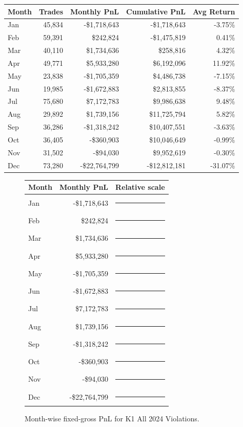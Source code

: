 \documentclass[11pt]{article}
\begin{document}
\begin{center}
\begin{tabular}{@{}lrrrr@{}}
\toprule
Month & Trades & Monthly PnL & Cumulative PnL & Avg Return \\
\midrule
Jan & 45,834 & -\$1,718,643 & -\$1,718,643 & -3.75\% \\
Feb & 59,391 & \$242,824 & -\$1,475,819 & 0.41\% \\
Mar & 40,110 & \$1,734,636 & \$258,816 & 4.32\% \\
Apr & 49,771 & \$5,933,280 & \$6,192,096 & 11.92\% \\
May & 23,838 & -\$1,705,359 & \$4,486,738 & -7.15\% \\
Jun & 19,985 & -\$1,672,883 & \$2,813,855 & -8.37\% \\
Jul & 75,680 & \$7,172,783 & \$9,986,638 & 9.48\% \\
Aug & 29,892 & \$1,739,156 & \$11,725,794 & 5.82\% \\
Sep & 36,286 & -\$1,318,242 & \$10,407,551 & -3.63\% \\
Oct & 36,405 & -\$360,903 & \$10,046,649 & -0.99\% \\
Nov & 31,502 & -\$94,030 & \$9,952,619 & -0.30\% \\
Dec & 73,280 & -\$22,764,799 & -\$12,812,181 & -31.07\% \\
\bottomrule
\end{tabular}
\end{center}

\begin{figure}[h]
\centering
\begin{tabular}{@{}lrl@{}}
\toprule
Month & Monthly PnL & Relative scale \\
\midrule
Jan & -\$1,718,643 & \textcolor{red}{\rule{0.8cm}{7pt}}\\
Feb & \$242,824 & \textcolor{green!50!black}{\rule{0.2cm}{7pt}}\\
Mar & \$1,734,636 & \textcolor{green!50!black}{\rule{0.8cm}{7pt}}\\
Apr & \$5,933,280 & \textcolor{green!50!black}{\rule{2.6cm}{7pt}}\\
May & -\$1,705,359 & \textcolor{red}{\rule{0.7cm}{7pt}}\\
Jun & -\$1,672,883 & \textcolor{red}{\rule{0.7cm}{7pt}}\\
Jul & \$7,172,783 & \textcolor{green!50!black}{\rule{3.2cm}{7pt}}\\
Aug & \$1,739,156 & \textcolor{green!50!black}{\rule{0.8cm}{7pt}}\\
Sep & -\$1,318,242 & \textcolor{red}{\rule{0.6cm}{7pt}}\\
Oct & -\$360,903 & \textcolor{red}{\rule{0.2cm}{7pt}}\\
Nov & -\$94,030 & \textcolor{red}{\rule{0.2cm}{7pt}}\\
Dec & -\$22,764,799 & \textcolor{red}{\rule{10.0cm}{7pt}}\\
\bottomrule
\end{tabular}
\caption{Month-wise fixed-gross PnL for K1 All 2024 Violations.}
\end{figure}
\end{document}
